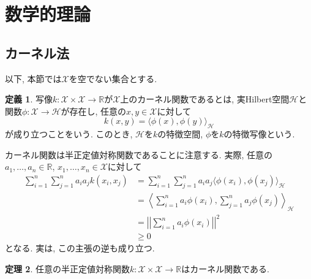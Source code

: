 \documentclass[uplatex]{jsarticle}
\theoremstyle{definition}
\newtheorem{definition}{定義}[section]
\newtheorem{theorem}[definition]{定理}
\numberwithin{equation}{section}
\newcommand{\R}{\mathbb{R}}
\newcommand{\norm}[1]{\left|\left|#1\right|\right|}
\begin{document}
\section{数学的理論}
\subsection{カーネル法}
以下, 本節では$\mathcal{X}$を空でない集合とする.
\begin{definition}
    写像$k \colon \mathcal{X} \times \mathcal{X} \to \R$が$\mathcal{X}$上のカーネル関数であるとは, 実Hilbert空間$\mathcal{H}$と関数$\phi \colon \mathcal{X} \to \mathcal{H}$が存在し, 任意の$x, y \in \mathcal{X}$に対して
    \begin{equation}
        k(x, y) = \langle\phi(x), \phi(y)\rangle_{\mathcal{H}}
    \end{equation}
    が成り立つことをいう.
    このとき, $\mathcal{H}$を$k$の特徴空間, $\phi$を$k$の特徴写像という.
\end{definition}
カーネル関数は半正定値対称関数であることに注意する.
実際, 任意の$a_{1}, \dots, a_{n} \in \R$, $x_{1}, \dots, x_{n} \in \mathcal{X}$に対して
\begin{align*}
    \sum_{i = 1}^{n} \sum_{j = 1}^{n} a_{i}a_{j}k(x_{i}, x_{j})
    &= \sum_{i = 1}^{n} \sum_{j = 1}^{n} a_{i}a_{j}\langle\phi(x_{i}), \phi(x_{j})\rangle_{\mathcal{H}} \\
    &= \left\langle\sum_{i = 1}^{n} a_{i}\phi(x_{i}), \sum_{j = 1}^{n} a_{j}\phi(x_{j})\right\rangle_{\mathcal{H}} \\
    &= \norm{\sum_{i = 1}^{n} a_{i}\phi(x_{i})}^{2} \\
    &\geq 0
\end{align*}
となる.
実は, この主張の逆も成り立つ.
\begin{theorem}
    任意の半正定値対称関数$k \colon \mathcal{X} \times \mathcal{X} \to \R$はカーネル関数である.
\end{theorem}
\end{document}
